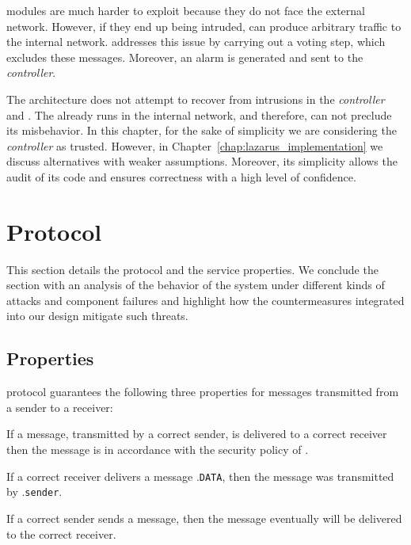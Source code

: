 \Repsieves modules are much harder to exploit because they do not face the external network. 
However, if they end up being intruded, \repsieves can produce arbitrary traffic to the internal network. 
\Postsieve addresses this issue by carrying out a voting step, which excludes these messages. Moreover, an alarm is generated and sent to the \emph{controller}.

The \sieveq architecture does not attempt to recover from intrusions in the \emph{controller} and \postsieve.
The \postsieve already runs in the internal network, and therefore, \sieveq can not preclude its misbehavior.
In this chapter, for the sake of simplicity we are considering the \emph{controller} as trusted.
However, in Chapter~\ref{chap:lazarus_implementation} we discuss alternatives with weaker assumptions.
Moreover, its simplicity allows the audit of its code and ensures correctness with a high level of confidence.


\section{\sieveq Protocol}
\label{protocol}

This section details the \sieveq protocol and the service properties. 
We conclude the section with an analysis of the behavior of the system under different kinds of attacks and component failures and highlight how the countermeasures integrated into our design mitigate such threats.

\subsection{Properties}
\label{properties}

\sieveq protocol guarantees the following three properties for messages transmitted from a sender to a receiver:

\begin{security}
If a message, transmitted by a correct sender, is delivered to a correct receiver then the message is in accordance with the security policy of \sieveq.
\end{security}

\begin{validity}
If a correct receiver delivers a message \msg.\texttt{DATA}, then the message was transmitted by \msg.\texttt{sender}.
\end{validity}

\begin{liveness}
If a correct sender sends a message, then the message eventually will be delivered to the correct receiver.
\end{liveness}

